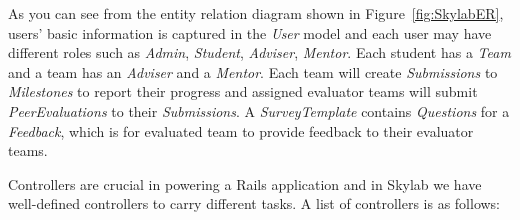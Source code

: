 As you can see from the entity relation diagram shown in Figure~\ref{fig:SkylabER}, users' basic information is captured in the \textit{User} model and each user may have different roles such as \textit{Admin}, \textit{Student}, \textit{Adviser}, \textit{Mentor}. Each student has a \textit{Team} and a team has an \textit{Adviser} and a \textit{Mentor}. Each team will create \textit{Submissions} to \textit{Milestones} to report their progress and assigned evaluator teams will submit \textit{PeerEvaluations} to their \textit{Submissions}. A \textit{SurveyTemplate} contains \textit{Questions} for a \textit{Feedback}, which is for evaluated team to provide feedback to their evaluator teams.

Controllers are crucial in powering a Rails application and in Skylab we have well-defined controllers to carry different tasks. A list of controllers is as follows:

